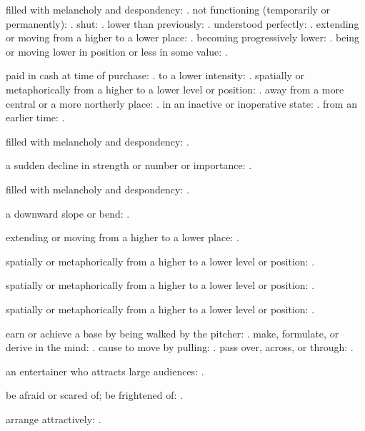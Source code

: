   filled with melancholy and despondency: . not functioning (temporarily or permanently): . shut: . lower than previously: . understood perfectly: . extending or moving from a higher to a lower place: . becoming progressively lower: . being or moving lower in position or less in some value: .

  paid in cash at time of purchase: . to a lower intensity: . spatially or metaphorically from a higher to a lower level or position: . away from a more central or a more northerly place: . in an inactive or inoperative state: . from an earlier time: .

  filled with melancholy and despondency: .

  a sudden decline in strength or number or importance: .

  filled with melancholy and despondency: .

  a downward slope or bend: .

  extending or moving from a higher to a lower place: .

  spatially or metaphorically from a higher to a lower level or position: .

  spatially or metaphorically from a higher to a lower level or position: .

  spatially or metaphorically from a higher to a lower level or position: .

  earn or achieve a base by being walked by the pitcher: . make, formulate, or derive in the mind: . cause to move by pulling: . pass over, across, or through: .

  an entertainer who attracts large audiences: .

  be afraid or scared of; be frightened of: .

  arrange attractively: .


